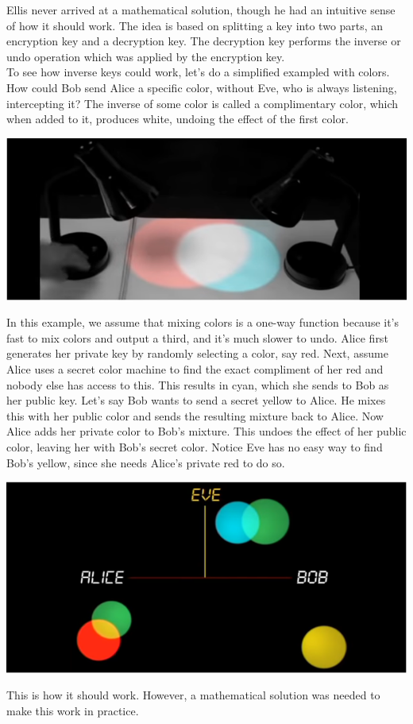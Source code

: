 \documentclass{report}
\begin{document}
 Ellis never arrived at a mathematical solution, though he had an intuitive sense of how it should work. The idea is based on splitting a key into two parts, an encryption key and a decryption key. The decryption key performs the inverse or undo operation which was applied by the encryption key. \\
To see how inverse keys could work, let's do a simplified exampled with colors. How could Bob send Alice a specific color, without Eve, who is always listening, intercepting it? The inverse of some color is called a complimentary color, which when added to it, produces white, undoing the effect of the first color. 
\begin{center}
	\includegraphics[scale=1]{30.png}
\end{center}
In this example, we assume that mixing colors is a one-way function because it's fast to mix colors and output a third, and it's much slower to undo. Alice first generates her private key by randomly selecting a color, say red. Next, assume Alice uses a secret color machine to find the exact compliment of her red and nobody else has access to this. This results in cyan, which she sends to Bob as her public key. Let's say Bob wants to send a secret yellow to Alice. He mixes this with her public color and sends the resulting mixture back to Alice. Now Alice adds her private color to Bob's mixture. This undoes the effect of her public color, leaving her with Bob's secret color. Notice Eve has no easy way to find Bob's yellow, since she needs Alice's private red to do so.
\begin{center}
	\includegraphics[scale=1]{31.png}
\end{center}
 This is how it should work. However, a mathematical solution was needed to make this work in practice.
\end{document}
